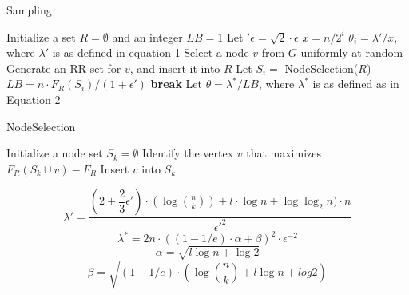 \documentclass[conference,compsoc]{IEEEtran}
\begin{document}
	
\begin{algorithm}[H]
	\caption{Sampling}
	\begin{algorithmic}[1]
		\State Initialize a set $R = \emptyset$ and an integer $LB = 1$
		\State Let $\prime{\epsilon} = \sqrt{2} \cdot \epsilon$ 
			\State $x = n/2^i$
			\State $\theta_i = \lambda\prime / x$, where $\lambda\prime$ is as defined in equation 1
			\State Select a node $v$ from $G$ uniformly at random
			\State Generate an RR set for $v$, and insert it into $R$
			\EndWhile
			\State Let $S_i = $ NodeSelection($R$)
			\State $LB = n \cdot F_R(S_i)/(1+\epsilon\prime)$ 
			\State \textbf{break}
			\EndIf	
		\EndFor
		\State Let $\theta = \lambda^\ast/LB$, where $\lambda^\ast$ is as defined as in Equation 2
		\EndFunction		
	\end{algorithmic}
\end{algorithm}

\begin{algorithm}[H]
	\caption{NodeSelection}
	\begin{algorithmic}[1]
		\State Initialize a node set $S_k = \emptyset$
		\State Identify the vertex $v$ that maximizes $F_R(S_k \cup v) - F_R$
		\State Insert $v$ into $S_k$
		\EndFor
		\EndFunction
	\end{algorithmic}
\end{algorithm}

\begin{equation}
\lambda\prime = \dfrac{(2 + \dfrac{2}{3}\epsilon\prime) \cdot (\log\binom{n}{k}) + l \cdot \log n + \log \log_2 n) \cdot n}{\epsilon\prime^2}
\end{equation}
\begin{equation}
\lambda^\ast = 2n \cdot ((1-1/e)\cdot\alpha+\beta)^2\cdot\epsilon^{-2}
\end{equation}
\begin{equation}
\alpha = \sqrt{l\log n + \log 2}
\end{equation}
\begin{equation}
\beta = \sqrt{(1 - 1/e) \cdot (\log\binom{n}{k} + l\log n + log 2)}
\end{equation}
\end{document}
